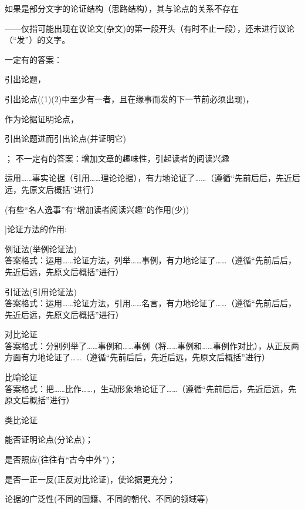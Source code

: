如果是部分文字的论证结构（思路结构），其与论点的关系不存在

——仅指可能出现在议论文(杂文)的第一段开头（有时不止一段），还未进行议论（``发''）的文字。\par
一定有的答案：\begin{inparaenum}[(1)]\item 引出论题，\item 引出论点((1)(2)中至少有一者，且在缘事而发的下一节前必须出现)，\item 作为论据证明论点，\item 引出论题进而引出论点(并证明它)\end{inparaenum}；
不一定有的答案：增加文章的趣味性，引起读者的阅读兴趣

运用\ldots{}\ldots{}事实论据（引用\ldots{}\ldots{}理论论据），有力地论证了\ldots{}\ldots{}（遵循``先前后后，先近后远，先原文后概括''进行）

(有些``名人逸事''有``增加读者阅读兴趣''的作用(少))

\hatsubsection[\hatm[增加1答案格式]{4}{2011-07-19}]{论证方法的作用:}
\begin{asparaenum}[(1)]
\item 例证法(举例论证法)\\
答案格式：运用\ldots{}\ldots{}论证方法，列举\ldots{}\ldots{}事例，有力地论证了\ldots{}\ldots{}（遵循``先前后后，先近后远，先原文后概括''进行）
\item 引证法(引用论证法)\\
答案格式：运用\ldots{}\ldots{}论证方法，引用\ldots{}\ldots{}名言，有力地论证了\ldots{}\ldots{}（遵循``先前后后，先近后远，先原文后概括''进行）
\item 对比论证\\
答案格式：分别列举了\ldots{}\ldots{}事例和\ldots{}\ldots{}事例（将\ldots{}\ldots{}事例和\ldots{}\ldots{}事例作对比），从正反两方面有力地论证了\ldots{}\ldots{}（遵循``先前后后，先近后远，先原文后概括''进行）
\item 比喻论证\\
答案格式：把\ldots{}\ldots{}比作\ldots{}\ldots{}，生动形象地论证了\ldots{}\ldots{}（遵循``先前后后，先近后远，先原文后概括''进行）
\item 类比论证
\end{asparaenum}

\begin{asparaenum}[(1)]
\item 能否证明论点(分论点)；
\item 是否照应(往往有``古今中外'')；
\item 是否一正一反(正反对比论证)，使论据更充分；
\item 论据的广泛性(不同的国籍、不同的朝代、不同的领域等)
\end{asparaenum}

